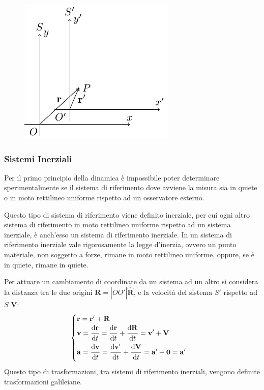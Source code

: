 \documentclass{article}
\newcommand{\vect}[1]{\boldsymbol{\mathbf{#1}}}
\newcommand{\df}{\mathrm{d}}
\numberwithin{equation}{subsection}
\begin{document}
\begin{figure}[H]%
    \centering
    \includegraphics{relativi-1.pdf}%
\end{figure}

\subsubsection{Sistemi Inerziali}
Per il primo principio della dinamica è impossibile poter 
determinare sperimentalmente se il sistema di riferimento dove 
avviene la misura sia in quiete o in moto rettilineo uniforme 
rispetto ad un osservatore esterno. 


Questo tipo di sistema di riferimento viene definito 
inerziale, per cui ogni altro sistema di riferimento in moto rettilineo uniforme rispetto ad un sistema inerziale, è anch'esso un sistema di riferimento inerziale. 
In un sistema di riferimento inerziale vale rigorosamente la legge d'inerzia, ovvero un punto materiale, non soggetto a forze, rimane in moto rettilineo uniforme, oppure, 
se è in quiete, rimane in quiete. 



Per attuare un 
cambiamento di coordinate da un sistema ad un altro si 
considera la distanza tra le due origini 
$\vect{R}=\left|\overline{OO'}\right|\hat{\vect{R}}$, e la velocità del 
sistema $S'$ rispetto ad $S$ $\vect{V}$:
\begin{equation}
    \begin{cases}
        \vect{r}=\vect{r}'+\vect{R}\\
        \vect{v}=\displaystyle\frac{\df\vect{r}\strut }{\df t\strut }=\frac{\df\vect{r}\strut }{\df t\strut }+\frac{\df\vect{R}\strut }{\df t\strut }=\vect{v}'+\vect{V}\\
        \vect{a}=\displaystyle\frac{\df\vect{v}\strut }{\df t\strut }=\frac{\df\vect{v}'\strut }{\df t\strut }+\frac{\df\vect{V}\strut }{\df t\strut }=\vect{a}'+\vect{0}=\vect{a}'
    \end{cases}
\end{equation}
Questo tipo di trasformazioni, tra sistemi di riferimento inerziali, vengono definite trasformazioni galileiane. 
\end{document}
